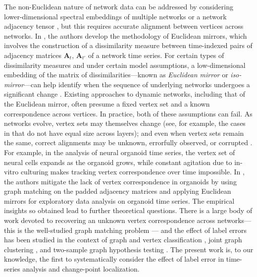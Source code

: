 \documentclass[12pt]{article}
\theoremstyle{definition}
\newcommand{\bA}{\mathbf{A}}
\begin{document}
The non-Euclidean nature of network data can be addressed by considering lower-dimensional spectral embeddings of multiple networks or a network adjacency tensor \cite{paul2020spectral,jing2021community,pantazis2022importance,macdonald2022latent,wang2023multilayer,athreya2025euclidean,agterberg2022joint,padilla2022change,gallagher2021spectral}, but this requires accurate alignment between vertices across networks.
In \cite{athreya2025euclidean}, the authors develop the methodology of Euclidean mirrors, which involves the construction of a dissimilarity measure between time-indexed pairs of adjacency matrices $\bA_{t}$, $\bA_{t'}$ of a network time series. 
For certain types of dissimilarity measures and under certain model assumptions, a low-dimensional embedding of the matrix of dissimilarities---known as {\em Euclidean mirror} or {\em iso-mirror}---can help identify when the sequence of underlying networks undergoes a significant change \cite{chen2023discovering, chen2024euclidean}. Existing approaches to dynamic networks, including that of the Euclidean mirror, often presume a fixed vertex set and a known correspondence across vertices. In practice, both of these assumptions can fail. 
As networks evolve, vertex sets may themselves change (see, for example, the cases in \cite{kivela2014multilayer} that do not have equal size across layers); and even when vertex sets remain the same, correct alignments may be unknown, errorfully observed, or corrupted \cite{priebe2015statistical, lyzinski16:_infoGM, arroyo2021maximum}.
For example, in the analysis of neural organoid time series, the vertex set of neural cells expands as the organoid grows, while constant agitation due to in-vitro culturing makes tracking vertex correspondence over time impossible.
In \cite{chen2023discovering}, the authors mitigate the lack of vertex correspondence in organoids by using graph matching on the padded adjacency matrices and applying Euclidean mirrors for exploratory data analysis on organoid time series. 
The empirical insights so obtained lead to further theoretical questions.
There is a large body of work devoted to recovering an unknown vertex correspondence across networks---this is the well-studied graph matching problem \cite{gms1,gms2,gms3}---
and the effect of label errors has been studied in the context of graph and vertex classification
\cite{vogelstein2015shuffled,chen_worm}, joint graph clustering \cite{racz2021correlated,racz2,chai2024efficient}, and two-sample graph hypothesis testing \cite{saxena2025lost,qi2025asymptotically}.
The present work is, to our knowledge, the first to systematically consider the effect of label error in time-series analysis and change-point localization.
\end{document}

